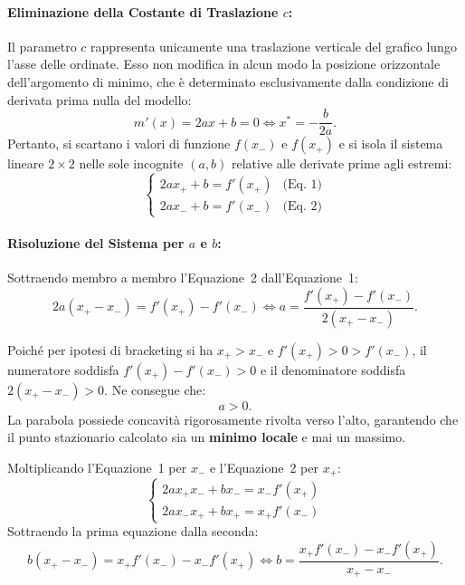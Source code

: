 \paragraph{Eliminazione della Costante di Traslazione $c$:}
Il parametro $c$ rappresenta unicamente una traslazione verticale del grafico lungo l'asse delle ordinate. Esso non modifica in alcun modo la posizione orizzontale dell'argomento di minimo, che \`e determinato esclusivamente dalla condizione di derivata prima nulla del modello:
\begin{equation}
    m'(x) = 2 a x + b = 0 \iff x^* = -\frac{b}{2a}.
    \label{eq:stationary-point-quadratic-model}
\end{equation}
Pertanto, si scartano i valori di funzione $f(x_-)$ e $f(x_+)$ e si isola il sistema lineare $2 \times 2$ nelle sole incognite $(a, b)$ relative alle derivate prime agli estremi:
\begin{equation}
    \begin{cases}
        2 a x_+ + b = f'(x_+) & \text{(Eq.~1)} \\
        2 a x_- + b = f'(x_-) & \text{(Eq.~2)}
    \end{cases}
    \label{eq:linear-system-quadratic-derivatives}
\end{equation}

\paragraph{Risoluzione del Sistema per $a$ e $b$:}
Sottraendo membro a membro l'Equazione~2 dall'Equazione~1:
\begin{equation}
    2 a (x_+ - x_-) = f'(x_+) - f'(x_-) \iff a = \frac{f'(x_+) - f'(x_-)}{2 (x_+ - x_-)}.
    \label{eq:quadratic-coeff-a}
\end{equation}
\begin{property}
Poich\'e per ipotesi di bracketing si ha $x_+ > x_-$ e $f'(x_+) > 0 > f'(x_-)$, il numeratore soddisfa $f'(x_+) - f'(x_-) > 0$ e il denominatore soddisfa $2(x_+ - x_-) > 0$. Ne consegue che:
\begin{equation}
    a > 0.
\end{equation}
La parabola possiede concavit\`a rigorosamente rivolta verso l'alto, garantendo che il punto stazionario calcolato sia un \textbf{minimo locale} e mai un massimo.
\end{property}

Moltiplicando l'Equazione~1 per $x_-$ e l'Equazione~2 per $x_+$:
\begin{equation}
    \begin{cases}
        2 a x_+ x_- + b x_- = x_- f'(x_+) \\
        2 a x_- x_+ + b x_+ = x_+ f'(x_-)
    \end{cases}
\end{equation}
Sottraendo la prima equazione dalla seconda:
\begin{equation}
    b (x_+ - x_-) = x_+ f'(x_-) - x_- f'(x_+) \iff b = \frac{x_+ f'(x_-) - x_- f'(x_+)}{x_+ - x_-}.
    \label{eq:quadratic-coeff-b}
\end{equation}

